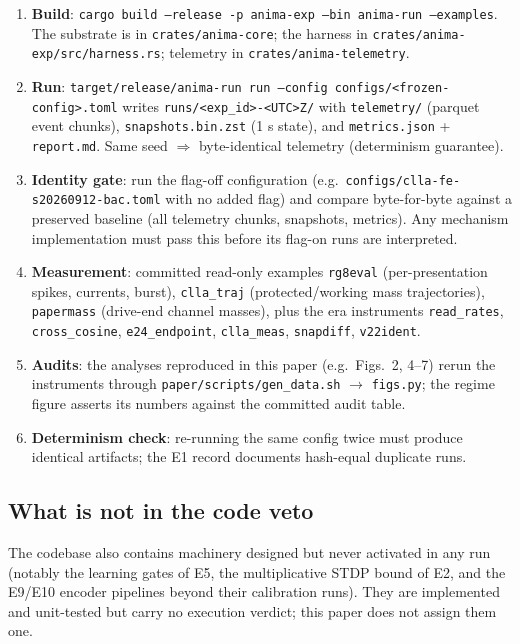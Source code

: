 \begin{enumerate}
\item \textbf{Build}: \texttt{cargo build --release -p anima-exp
--bin anima-run --examples}. The substrate is in
\texttt{crates/anima-core}; the harness in
\texttt{crates/anima-exp/src/harness.rs}; telemetry in
\texttt{crates/anima-telemetry}.
\item \textbf{Run}: \texttt{target/release/anima-run run --config
configs/<frozen-config>.toml} writes
\texttt{runs/<exp\_id>-<UTC>Z/} with \texttt{telemetry/} (parquet
event chunks), \texttt{snapshots.bin.zst} (1 s state), and
\texttt{metrics.json} + \texttt{report.md}. Same seed
\(\Rightarrow\) byte-identical telemetry (determinism guarantee).
\item \textbf{Identity gate}: run the flag-off configuration (e.g.\
\texttt{configs/clla-fe-s20260912-bac.toml} with no added flag) and
compare byte-for-byte against a preserved baseline (all telemetry
chunks, snapshots, metrics). Any mechanism implementation must pass
this before its flag-on runs are interpreted.
\item \textbf{Measurement}: committed read-only examples
\texttt{rg8eval} (per-presentation spikes, currents, burst),
\texttt{clla\_traj} (protected/working mass trajectories),
\texttt{papermass} (drive-end channel masses), plus the era
instruments \texttt{read\_rates}, \texttt{cross\_cosine},
\texttt{e24\_endpoint}, \texttt{clla\_meas}, \texttt{snapdiff},
\texttt{v22ident}.
\item \textbf{Audits}: the analyses reproduced in this paper
(e.g.\ Figs.\ 2, 4--7) rerun the instruments through
\texttt{paper/scripts/gen\_data.sh} \(\to\) \texttt{figs.py}; the
regime figure asserts its numbers against the committed audit table.
\item \textbf{Determinism check}: re-running the same config twice
must produce identical artifacts; the E1 record documents hash-equal
duplicate runs.
\end{enumerate}

\subsection{What is not in the code veto}

The codebase also contains machinery designed but never activated in
any run (notably the learning gates of E5, the multiplicative STDP
bound of E2, and the E9/E10 encoder pipelines beyond their calibration
runs). They are implemented and unit-tested but carry no execution
verdict; this paper does not assign them one.